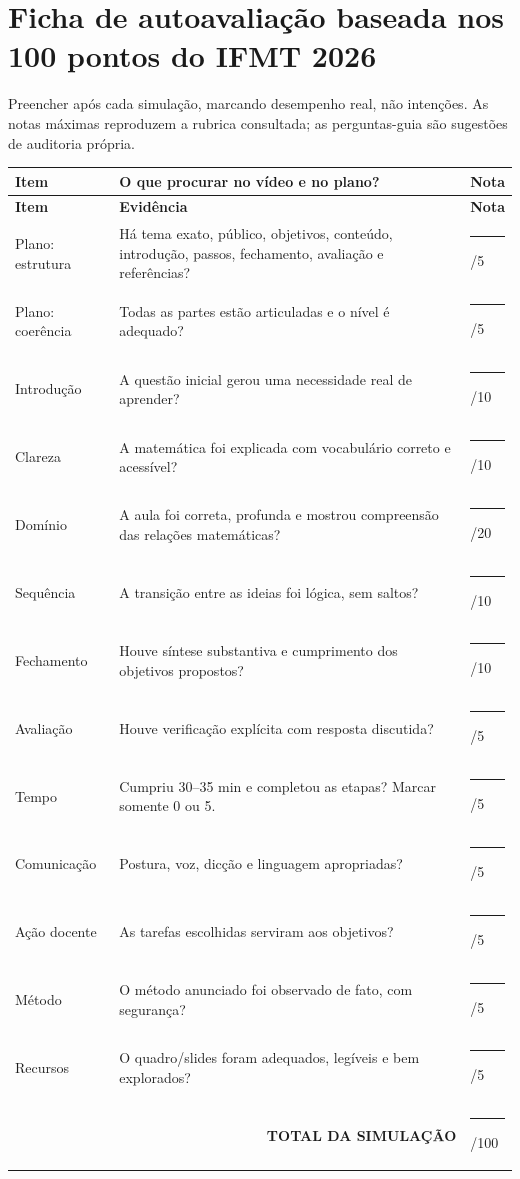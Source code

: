 \documentclass[11pt,a4paper]{article}
\begin{document}
\section{Ficha de autoavaliação baseada nos 100 pontos do IFMT 2026}
Preencher após cada simulação, marcando desempenho real, não intenções. As notas máximas reproduzem a rubrica consultada; as perguntas-guia são sugestões de auditoria própria.
\small
{}
\begin{longtable}{p{}p{}p{}}
\toprule\textbf{Item} & \textbf{O que procurar no vídeo e no plano?} & \textbf{Nota}\\\midrule\endfirsthead
\toprule\textbf{Item}&\textbf{Evidência}&\textbf{Nota}\\\midrule\endhead
Plano: estrutura & Há tema exato, público, objetivos, conteúdo, introdução, passos, fechamento, avaliação e referências? &\rule{1cm}{.4pt}/5\\
Plano: coerência & Todas as partes estão articuladas e o nível é adequado? &\rule{1cm}{.4pt}/5\\
Introdução & A questão inicial gerou uma necessidade real de aprender? &\rule{1cm}{.4pt}/10\\
Clareza & A matemática foi explicada com vocabulário correto e acessível? &\rule{1cm}{.4pt}/10\\
Domínio & A aula foi correta, profunda e mostrou compreensão das relações matemáticas? &\rule{1cm}{.4pt}/20\\
Sequência & A transição entre as ideias foi lógica, sem saltos? &\rule{1cm}{.4pt}/10\\
Fechamento & Houve síntese substantiva e cumprimento dos objetivos propostos? &\rule{1cm}{.4pt}/10\\
Avaliação & Houve verificação explícita com resposta discutida? &\rule{1cm}{.4pt}/5\\
Tempo & Cumpriu 30--35 min e completou as etapas? Marcar somente 0 ou 5. &\rule{1cm}{.4pt}/5\\
Comunicação & Postura, voz, dicção e linguagem apropriadas? &\rule{1cm}{.4pt}/5\\
Ação docente & As tarefas escolhidas serviram aos objetivos? &\rule{1cm}{.4pt}/5\\
Método & O método anunciado foi observado de fato, com segurança? &\rule{1cm}{.4pt}/5\\
Recursos & O quadro/slides foram adequados, legíveis e bem explorados? &\rule{1cm}{.4pt}/5\\\midrule
\multicolumn{2}{r}{\textbf{TOTAL DA SIMULAÇÃO}}&\rule{1cm}{.4pt}/100\\\bottomrule
\end{longtable}
\normalsize{}
\end{document}
